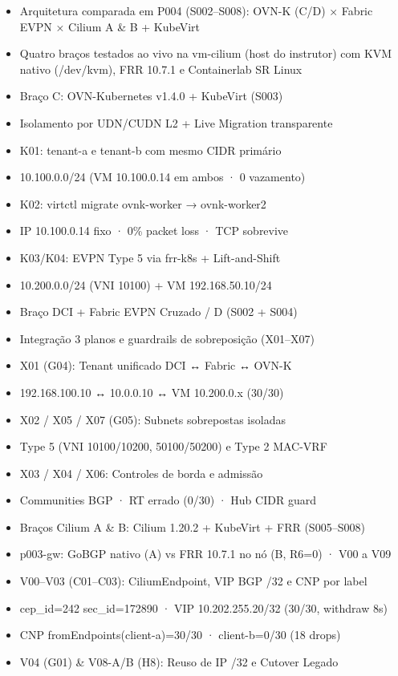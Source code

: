 \documentclass[12pt,openany,oneside,a4paper,chapter=TITLE,english,brazil]{abntex2}
\providecommand{\tightlist}{\setlength{\itemsep}{0pt}\setlength{\parskip}{0pt}}
\begin{document}
\begin{itemize}
\tightlist
\item
  Arquitetura comparada em P004 (S002--S008): OVN-K (C/D) × Fabric EVPN × Cilium A \& B + KubeVirt
\item
  Quatro braços testados ao vivo na vm-cilium (host do instrutor) com KVM nativo (/dev/kvm), FRR 10.7.1 e Containerlab SR Linux
\item
  Braço C: OVN-Kubernetes v1.4.0 + KubeVirt (S003)
\item
  Isolamento por UDN/CUDN L2 + Live Migration transparente
\item
  K01: tenant-a e tenant-b com mesmo CIDR primário
\item
  10.100.0.0/24 (VM 10.100.0.14 em ambos · 0 vazamento)
\item
  K02: virtctl migrate ovnk-worker → ovnk-worker2
\item
  IP 10.100.0.14 fixo · 0\% packet loss · TCP sobrevive
\item
  K03/K04: EVPN Type 5 via frr-k8s + Lift-and-Shift
\item
  10.200.0.0/24 (VNI 10100) + VM 192.168.50.10/24
\item
  Braço DCI + Fabric EVPN Cruzado / D (S002 + S004)
\item
  Integração 3 planos e guardrails de sobreposição (X01--X07)
\item
  X01 (G04): Tenant unificado DCI ↔ Fabric ↔ OVN-K
\item
  192.168.100.10 ↔ 10.0.0.10 ↔ VM 10.200.0.x (30/30)
\item
  X02 / X05 / X07 (G05): Subnets sobrepostas isoladas
\item
  Type 5 (VNI 10100/10200, 50100/50200) e Type 2 MAC-VRF
\item
  X03 / X04 / X06: Controles de borda e admissão
\item
  Communities BGP · RT errado (0/30) · Hub CIDR guard
\item
  Braços Cilium A \& B: Cilium 1.20.2 + KubeVirt + FRR (S005--S008)
\item
  p003-gw: GoBGP nativo (A) vs FRR 10.7.1 no nó (B, R6=0) · V00 a V09
\item
  V00--V03 (C01--C03): CiliumEndpoint, VIP BGP /32 e CNP por label
\item
  cep\_id=242 sec\_id=172890 · VIP 10.202.255.20/32 (30/30, withdraw 8s)
\item
  CNP fromEndpoints(client-a)=30/30 · client-b=0/30 (18 drops)
\item
  V04 (G01) \& V08-A/B (H8): Reuso de IP /32 e Cutover Legado

\end{itemize}
\end{document}
